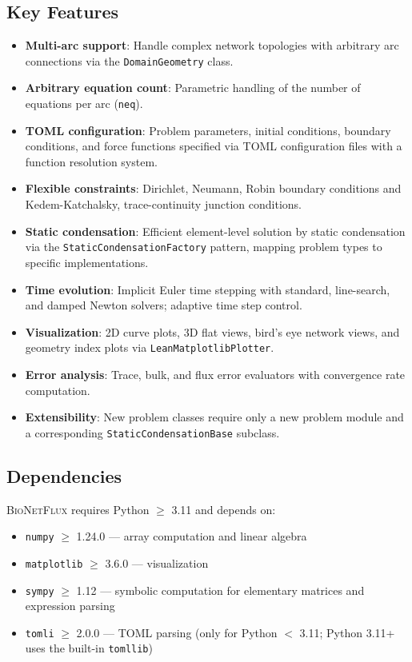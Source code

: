 \documentclass[11pt,a4paper]{article}
\newcommand{\code}[1]{\texttt{#1}}
\newcommand{\bionetflux}{\textsc{BioNetFlux}}
\begin{document}
\subsection{Key Features}

\begin{itemize}
    \item \textbf{Multi-arc support}: Handle complex network topologies with arbitrary arc connections via the \code{DomainGeometry} class.
    \item \textbf{Arbitrary equation count}: Parametric handling of the number of equations per arc (\code{neq}).
    \item \textbf{TOML configuration}: Problem parameters, initial conditions, boundary conditions, and force functions specified via TOML configuration files with a function resolution system.
    \item \textbf{Flexible constraints}: Dirichlet, Neumann, Robin boundary conditions and Kedem-Katchalsky, trace-continuity junction conditions.
    \item \textbf{Static condensation}: Efficient element-level solution by static condensation via the \code{StaticCondensationFactory} pattern, mapping problem types to specific implementations.
    \item \textbf{Time evolution}: Implicit Euler time stepping with standard, line-search, and damped Newton solvers; adaptive time step control.
    \item \textbf{Visualization}: 2D curve plots, 3D flat views, bird's eye network views, and geometry index plots via \code{LeanMatplotlibPlotter}.
    \item \textbf{Error analysis}: Trace, bulk, and flux error evaluators with convergence rate computation.
    \item \textbf{Extensibility}: New problem classes require only a new problem module and a corresponding \code{StaticCondensationBase} subclass.
\end{itemize}

\subsection{Dependencies}

\bionetflux{} requires Python $\ge$ 3.11 and depends on:
\begin{itemize}
	\item \code{numpy} $\ge$ 1.24.0 --- array computation and linear algebra
	\item \code{matplotlib} $\ge$ 3.6.0 --- visualization
	\item \code{sympy} $\ge$ 1.12 --- symbolic computation for elementary matrices and expression parsing
	\item \code{tomli} $\ge$ 2.0.0 --- TOML parsing (only for Python $<$ 3.11; Python 3.11+ uses the built-in \code{tomllib})
\end{itemize}
\end{document}
